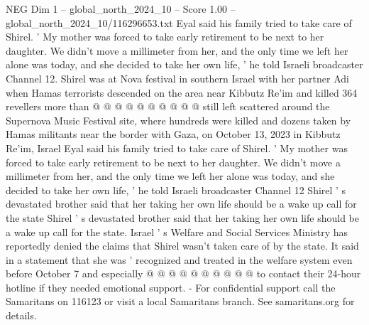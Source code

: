 \begin{textsample}{NEG Dim 1 – global\_north\_2024\_10 – Score 1.00 – global\_north\_2024\_10/116296653.txt}
Eyal said his family tried to take care of Shirel. ' My mother was forced to take early retirement to be next to her daughter.
We didn't move a millimeter from her, and the only time we left her alone was today, and she decided to take her own life, ' he told Israeli broadcaster Channel 12.
Shirel was at Nova festival in southern Israel with her partner Adi when Hamas terrorists descended on the area near Kibbutz Re'im and killed 364 revellers more than @ @ @ @ @ @ @ @ @ @ still left scattered around the Supernova Music Festival site, where hundreds were killed and dozens taken by Hamas militants near the border with Gaza, on October 13, 2023 in Kibbutz Re'im, Israel Eyal said his family tried to take care of Shirel. ' My mother was forced to take early retirement to be next to her daughter.
We didn't move a millimeter from her, and the only time we left her alone was today, and she decided to take her own life, ' he told Israeli broadcaster Channel 12 Shirel ' s devastated brother said that her taking her own life should be a wake up call for the state Shirel ' s devastated brother said that her taking her own life should be a wake up call for the state.
Israel ' s Welfare and Social Services Ministry has reportedly denied the claims that Shirel wasn't taken care of by the state.
It said in a statement that she was ' recognized and treated in the welfare system even before October 7 and especially @ @ @ @ @ @ @ @ @ @ to contact their 24-hour hotline if they needed emotional support. - For confidential support call the Samaritans on 116123 or visit a local Samaritans branch.
See samaritans.org for details.

\end{textsample}
